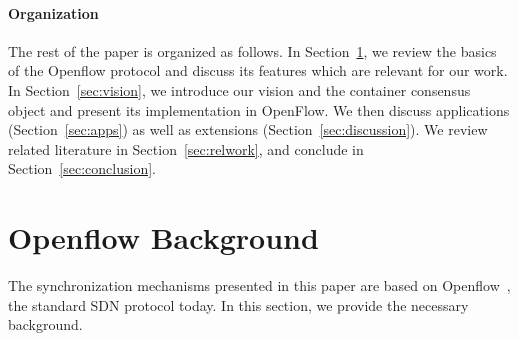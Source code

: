 \documentclass[conference]{sigcomm-alternate}
\begin{document}

\paragraph{Organization}
The rest of the paper is organized as follows.
In Section~\ref{sec:background}, we review the basics of the  Openflow
protocol and discuss its features which are relevant for our work.
In Section~\ref{sec:vision}, we introduce our vision and the container consensus object 
and present its implementation in OpenFlow.
We then discuss applications (Section~\ref{sec:apps}) as
well as extensions (Section~\ref{sec:discussion}).
We review related literature in Section~\ref{sec:relwork}, and conclude
in Section~\ref{sec:conclusion}.


\section{Openflow Background}\label{sec:background}

The synchronization mechanisms presented in this paper
are based on Openflow~\cite{of-spec}, the standard SDN protocol today. In this section,
we provide the necessary background.
\end{document}
